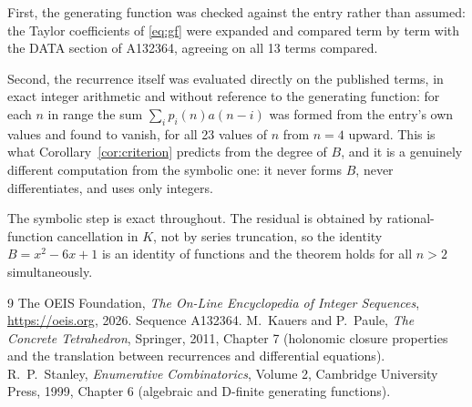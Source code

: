 \documentclass[11pt,a4paper]{article}
\theoremstyle{plain}
\theoremstyle{definition}
\begin{document}
First, the generating function was checked against the entry rather than assumed: the
Taylor coefficients of \eqref{eq:gf} were expanded and compared term by term with the DATA
section of A132364, agreeing on all 13 terms compared.

Second, the recurrence itself was evaluated directly on the published terms, in exact
integer arithmetic and without reference to the generating function: for each $n$ in range
the sum $\sum_{i}p_{i}(n)a(n-i)$ was formed from the entry's own values and found to
vanish, for all 23 values of $n$ from $n=4$ upward. This is what
Corollary~\ref{cor:criterion} predicts from the degree of $B$, and it is a genuinely
different computation from the symbolic one: it never forms $B$, never differentiates, and
uses only integers.

The symbolic step is exact throughout. The residual is obtained by rational-function
cancellation in $K$, not by series truncation, so the identity $B=x^{2} - 6 x + 1$ is an
identity of functions and the theorem holds for all $n>2$ simultaneously.

\begin{thebibliography}{9}
 The OEIS Foundation, \emph{The On-Line Encyclopedia of Integer Sequences},
\url{https://oeis.org}, 2026. Sequence A132364.
 M.~Kauers and P.~Paule, \emph{The Concrete Tetrahedron}, Springer, 2011,
Chapter 7 (holonomic closure properties and the translation between recurrences and
differential equations).
 R.~P.~Stanley, \emph{Enumerative Combinatorics}, Volume 2, Cambridge
University Press, 1999, Chapter 6 (algebraic and D-finite generating functions).
\end{thebibliography}
\end{document}
